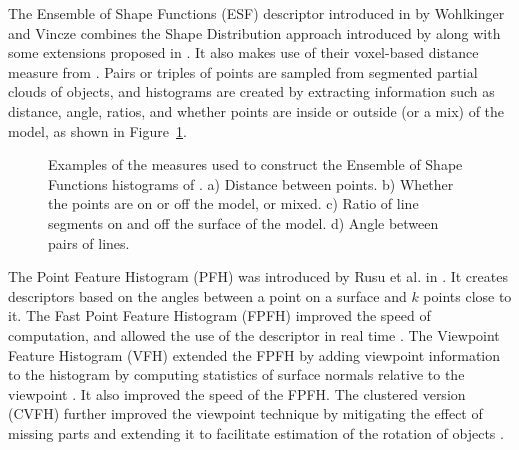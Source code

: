\documentclass[11pt,a4paper]{kth-mag}
\begin{document}
The Ensemble of Shape Functions (ESF) descriptor introduced in
\cite{wohlkinger2011ensemble} by Wohlkinger and Vincze combines the Shape
Distribution approach introduced by \cite{osada2002shape} along with some
extensions proposed in \cite{ip2002using}. It also makes use of their
voxel-based distance measure from \cite{wohlkinger2011shapedist}. Pairs or
triples of points are sampled from segmented partial clouds of objects, and
histograms are created by extracting information such as distance, angle,
ratios, and whether points are inside or outside (or a mix) of the model, as
shown in Figure~\ref{fig:wohlESF}.

\begin{figure}
  \centering
  \caption{Examples of the measures used to construct the Ensemble of Shape
    Functions histograms of \cite{wohlkinger2011ensemble}. a) Distance between
    points. b) Whether the points are on or off the model, or mixed. c) Ratio of
    line segments on and off the surface of the model. d) Angle between pairs of lines.}
  \label{fig:wohlESF}
\end{figure}

The Point Feature Histogram (PFH) was introduced by Rusu et al. in
\cite{rusu2008persistent}. It creates descriptors based on the angles between a
point on a surface and $k$ points close to it. The Fast Point Feature Histogram
(FPFH) improved the speed of computation, and allowed the use of the descriptor
in real time \cite{rusu2009fast}. The Viewpoint Feature Histogram (VFH) extended
the FPFH by adding viewpoint information to the histogram by computing
statistics of surface normals relative to the viewpoint \cite{rusu2010fast}. It
also improved the speed of the FPFH. The clustered version (CVFH) further
improved the viewpoint technique by mitigating the effect of missing parts and
extending it to facilitate estimation of the rotation of objects \cite{aldoma2011cad}.
\end{document}
